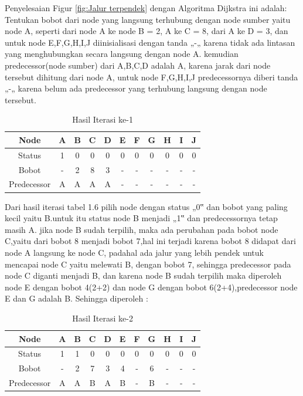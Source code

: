 \begin{enumerate}
Penyelesaian Figur \ref{fig:Jalur terpendek} dengan Algoritma Dijkstra ini adalah:
Tentukan bobot dari node yang langsung terhubung dengan node sumber yaitu node A, seperti dari node A ke node B = 2, A ke C = 8, dari A ke D = 3, dan untuk node E,F,G,H,I,J diinisialisasi dengan tanda „-„ karena tidak ada lintasan yang menghubungkan secara langsung dengan node A. kemudian predecessor(node sumber) dari A,B,C,D adalah A, karena jarak dari node tersebut dihitung dari node A, untuk node F,G,H,I,J predecessornya diberi tanda „-„ karena belum ada predecessor yang terhubung langsung dengan node tersebut.

\begin{table}[htbp]
\begin{center}
\begin{tabular}{|c|c|c|c|c|c|c|c|c|c|c|}
\hline
Node & A & B & C & D & E & F & G & H & I & J \\
\hline
Status & 1 & 0 & 0 & 0 & 0 & 0 & 0 & 0 & 0 & 0\\
\hline
Bobot & - & 2 & 8 & 3 & - & - & - & - & - & - \\
\hline
Predecessor & A & A & A & A & - & - & - & - & -  & - \\
\hline
\end{tabular}
\caption{Hasil Iterasi ke-1}
\end{center}
\end{table}

Dari hasil iterasi tabel 1.6 pilih node dengan status „0‟ dan bobot yang paling kecil yaitu B.untuk itu status node B menjadi „1‟ dan predecessornya tetap masih A. jika node B sudah terpilih, maka ada perubahan pada bobot node C,yaitu dari bobot 8 menjadi bobot 7,hal ini terjadi karena bobot 8 didapat dari node A langsung ke node C, padahal ada jalur yang lebih pendek untuk mencapai node C yaitu melewati B, dengan bobot 7, sehingga predecessor pada node C diganti menjadi B, dan karena node B sudah terpilih maka diperoleh node E dengan bobot 4(2+2) dan node G dengan bobot 6(2+4),predecessor node E dan G adalah B. Sehingga diperoleh :

\begin{table}[htbp]
\begin{center}
\begin{tabular}{|c|c|c|c|c|c|c|c|c|c|c|}
\hline
Node & A & B & C & D & E & F & G & H & I & J \\
\hline
Status & 1 & 1 & 0 & 0 & 0 & 0 & 0 & 0 & 0 & 0\\
\hline
Bobot & - & 2 & 7 & 3 & 4 & - & 6 & - & - & - \\
\hline
Predecessor & A & A & B & A & B & - & B & - & -  & - \\
\hline
\end{tabular}
\caption{Hasil Iterasi ke-2}
\end{center}
\end{table}


\end{enumerate}
